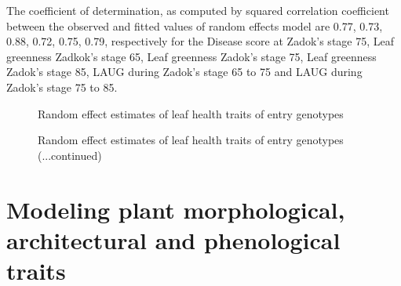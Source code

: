 \documentclass[12pt,oneside]{dukestatscithesis} %
\begin{document}
The coefficient of determination, as computed by squared correlation coefficient between the observed and fitted values of random effects model are 0.77, 0.73, 0.88, 0.72, 0.75, 0.79, respectively for the Disease score at Zadok's stage 75, Leaf greenness Zadkok's stage 65, Leaf greenness Zadok's stage 75, Leaf greenness Zadok's stage 85, LAUG during Zadok's stage 65 to 75 and LAUG during Zadok's stage 75 to 85.
\begin{figure}[H]

{\centering {}\newline{}

}

\caption{Random effect estimates of leaf health traits of entry genotypes}\label{fig:leaf-health-dotplot}
\end{figure}
\begin{figure}[H]

{\centering {}

}

\caption{Random effect estimates of leaf health traits of entry genotypes (...continued)}\label{fig:leaf-health-dotplot2}
\end{figure}
\clearpage

\hypertarget{modeling-plant-morphological-architectural-and-phenological-traits}{%
\section{Modeling plant morphological, architectural and phenological traits}\label{modeling-plant-morphological-architectural-and-phenological-traits}}
\end{document}
